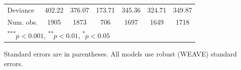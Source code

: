 \documentclass[a4paper]{article}\usepackage[]{graphicx}\usepackage[]{color}
\begin{document}
\begin{table}
\begin{center}
\begin{tabular}{l c c c c c c }
Deviance                & 402.22        & 376.07        & 173.71       & 345.36        & 324.71       & 349.87       \\
Num. obs.               & 1905          & 1873          & 706          & 1697          & 1649         & 1718         \\
\hline
\multicolumn{7}{l}{\scriptsize{\textsuperscript{***}$p<0.001$, 
  \textsuperscript{**}$p<0.01$, 
  \textsuperscript{*}$p<0.05$}}
\end{tabular}



\end{center}
{\scriptsize{
    Standard errors are in parentheses. All models use robust (WEAVE) standard errors. \\
}}
\end{table}
\end{document}
